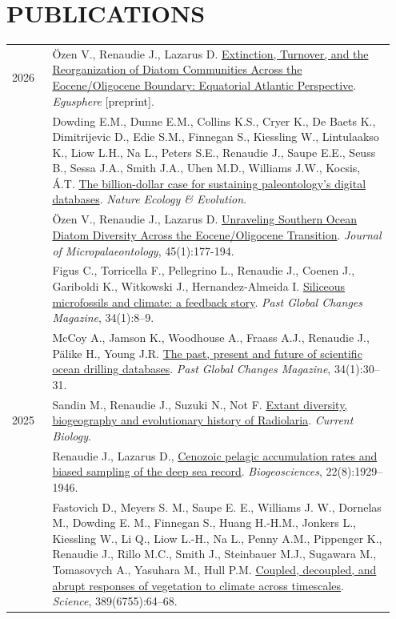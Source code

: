 \documentclass[11pt, a4paper]{article}
\begin{document}
\section{PUBLICATIONS}
\begin{longtable}{@{}p{0.1\linewidth} >{\small}P{0.85\linewidth}@{}}
2026 & Özen V., Renaudie J., Lazarus D. \href{https://doi.org/10.5194/egusphere-2026-1009}{Extinction, Turnover, and the Reorganization of Diatom Communities Across the Eocene/Oligocene Boundary: Equatorial Atlantic Perspective}. \textit{Egusphere} [preprint].\\
    & Dowding E.M., Dunne E.M., Collins K.S., Cryer K., De Baets K., Dimitrijevic D., Edie S.M., Finnegan S., Kiessling W., Lintulaakso K., Liow L.H., Na L., Peters S.E., Renaudie J., Saupe E.E., Seuss B., Sessa J.A., Smith J.A., Uhen M.D., Williams J.W., Kocsis, Á.T. \href{https://doi.org/10.1038/s41559-026-02985-8}{The billion-dollar case for sustaining paleontology’s digital databases}. \textit{Nature Ecology \& Evolution}.\\ 
    & Özen V., Renaudie J., Lazarus D. \href{https://doi.org/10.5194/jm-45-177-2026}{Unraveling Southern Ocean Diatom Diversity Across the Eocene/Oligocene Transition}. \textit{Journal of Micropalaeontology}, 45(1):177-194.\\
    & Figus C., Torricella F., Pellegrino L., Renaudie J., Coenen J., Gariboldi K., Witkowski J., Hernandez-Almeida I. \href{https://doi.org/10.22498/pages.34.1.8}{Siliceous microfossils and climate: a feedback story}. \textit{Past Global Changes Magazine}, 34(1):8--9.\\ 
    & McCoy A., Jamson K., Woodhouse A., Fraass A.J., Renaudie J., Pälike H., Young J.R. \href{https://doi.org/10.22498/pages.34.1.30}{The past, present and future of scientific ocean drilling databases}. \textit{Past Global Changes Magazine}, 34(1):30--31.\\ 
2025 & Sandin M., Renaudie J., Suzuki N., Not F. \href{http://doi.org/10.1016/j.cub.2025.04.032 }{Extant diversity, biogeography and evolutionary history of Radiolaria}. \textit{Current Biology}.\\
    & Renaudie J., Lazarus D., \href{https://bg.copernicus.org/articles/22/1929/2025/}{Cenozoic pelagic accumulation rates and biased sampling of the deep sea record}. \textit{Biogeosciences}, 22(8):1929--1946.\\
    & Fastovich D., Meyers S. M., Saupe E. E., Williams J. W., Dornelas M., Dowding E. M., Finnegan S., Huang H.-H.M., Jonkers L., Kiessling W., Li Q., Liow L.-H., Na L., Penny A.M., Pippenger K., Renaudie J., Rillo M.C., Smith J., Steinbauer M.J., Sugawara M., Tomasovych A., Yasuhara M., Hull P.M. \href{https://www.science.org/doi/10.1126/science.adr6700}{Coupled, decoupled, and abrupt responses of vegetation to climate across timescales}. \textit{Science}, 389(6755):64--68.\\

\end{longtable}
\end{document}
